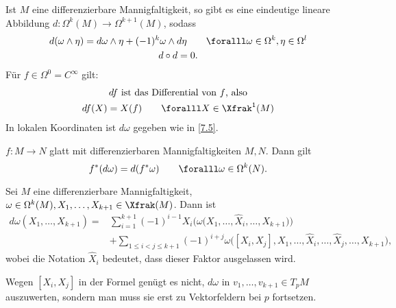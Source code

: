 \begin{thm}
	Ist $M$ eine differenzierbare Mannigfaltigkeit, so gibt es eine eindeutige lineare Abbildung $ d: \Omega^k(M) \to \Omega^{k+1}(M) $, sodass
	\begin{gather*}
		d(\omega \wedge \eta) = d\omega \wedge \eta + (-1)^k \omega \wedge d \eta \qquad \foralll \omega \in \Omega^k, \eta \in \Omega^l\\
		d \circ d = 0.
	\end{gather*}
	Für $ f \in \Omega^0 = C^\infty $ gilt:
	\begin{gather*}
		df \ \text{ist das Differential von $f$, also}\\
		df(X) = X(f) \qquad \foralll X \in \Xfrak^1(M)
	\end{gather*}
	In lokalen Koordinaten ist $d\omega$ gegeben wie in \ref{7.5}.
\end{thm}

\begin{lem}
	$ f: M \to N $ glatt mit differenzierbaren Mannigfaltigkeiten $M,N$. Dann gilt
	\[ f^*(d\omega) = d(f^*\omega) \qquad \foralll \omega \in \Omega^k(N). \]
\end{lem}

\begin{lem}
	Sei $M$ eine differenzierbare Mannigfaltigkeit, $\omega \in \Omega^k(M), X_1, \dotsc, X_{k+1} \in \Xfrak(M)$. Dann ist
	\begin{align*}
		d\omega (X_1, \dots, X_{k+1}) =& \sum_{i=1}^{k+1} (-1)^{i-1} X_i \Big( \omega \big(X_1, \dotsc, \hat{X}_i, \dotsc, X_{k+1}\big) \Big) \\
			&+ \sum_{1 \leq i < j \leq k+1} (-1)^{i+j} \omega \big([X_i,X_j], X_1, \dotsc, \hat{X}_i, \dotsc, \hat{X}_j, \dotsc, X_{k+1} \big),
	\end{align*}
	wobei die Notation $\hat{X}_i$ bedeutet, dass dieser Faktor ausgelassen wird.
\end{lem}

\begin{rem*}
	Wegen $ [X_i,X_j] $ in der Formel genügt es nicht, $d\omega$ in $v_1, \dotsc, v_{k+1} \in T_pM$ auszuwerten, sondern man muss sie erst zu Vektorfeldern bei $p$ fortsetzen.
\end{rem*}


